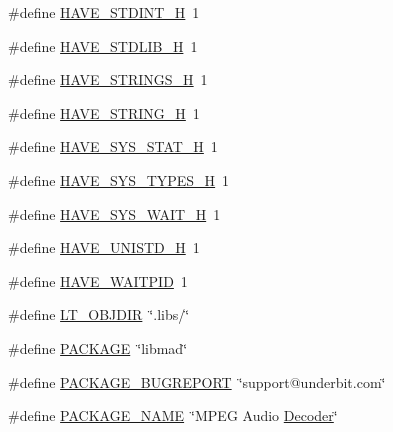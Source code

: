 \begin{DoxyCompactItemize}
\item 
\#define \hyperlink{mac_2config_2i386_2lib-src_2libmad_2config_8h_ab6cd6d1c63c1e26ea2d4537b77148354}{H\+A\+V\+E\+\_\+\+S\+T\+D\+I\+N\+T\+\_\+H}~1
\item 
\#define \hyperlink{mac_2config_2i386_2lib-src_2libmad_2config_8h_a9e0e434ec1a6ddbd97db12b5a32905e0}{H\+A\+V\+E\+\_\+\+S\+T\+D\+L\+I\+B\+\_\+H}~1
\item 
\#define \hyperlink{mac_2config_2i386_2lib-src_2libmad_2config_8h_a405d10d46190bcb0320524c54eafc850}{H\+A\+V\+E\+\_\+\+S\+T\+R\+I\+N\+G\+S\+\_\+H}~1
\item 
\#define \hyperlink{mac_2config_2i386_2lib-src_2libmad_2config_8h_ad4c234dd1625255dc626a15886306e7d}{H\+A\+V\+E\+\_\+\+S\+T\+R\+I\+N\+G\+\_\+H}~1
\item 
\#define \hyperlink{mac_2config_2i386_2lib-src_2libmad_2config_8h_ace156430ba007d19b4348a950d0c692b}{H\+A\+V\+E\+\_\+\+S\+Y\+S\+\_\+\+S\+T\+A\+T\+\_\+H}~1
\item 
\#define \hyperlink{mac_2config_2i386_2lib-src_2libmad_2config_8h_a69dc70bea5d1f8bd2be9740e974fa666}{H\+A\+V\+E\+\_\+\+S\+Y\+S\+\_\+\+T\+Y\+P\+E\+S\+\_\+H}~1
\item 
\#define \hyperlink{mac_2config_2i386_2lib-src_2libmad_2config_8h_af249315f5939884ce5b4585ca81a1e39}{H\+A\+V\+E\+\_\+\+S\+Y\+S\+\_\+\+W\+A\+I\+T\+\_\+H}~1
\item 
\#define \hyperlink{mac_2config_2i386_2lib-src_2libmad_2config_8h_a219b06937831d0da94d801ab13987639}{H\+A\+V\+E\+\_\+\+U\+N\+I\+S\+T\+D\+\_\+H}~1
\item 
\#define \hyperlink{mac_2config_2i386_2lib-src_2libmad_2config_8h_a9196ec9c05152e1058c8a20a5ffd3f1a}{H\+A\+V\+E\+\_\+\+W\+A\+I\+T\+P\+ID}~1
\item 
\#define \hyperlink{mac_2config_2i386_2lib-src_2libmad_2config_8h_ac2d5925d76379847dd9fc4747b061659}{L\+T\+\_\+\+O\+B\+J\+D\+IR}~\char`\"{}.libs/\char`\"{}
\item 
\#define \hyperlink{mac_2config_2i386_2lib-src_2libmad_2config_8h_aca8570fb706c81df371b7f9bc454ae03}{P\+A\+C\+K\+A\+GE}~\char`\"{}libmad\char`\"{}
\item 
\#define \hyperlink{mac_2config_2i386_2lib-src_2libmad_2config_8h_a1d1d2d7f8d2f95b376954d649ab03233}{P\+A\+C\+K\+A\+G\+E\+\_\+\+B\+U\+G\+R\+E\+P\+O\+RT}~\char`\"{}support@underbit.\+com\char`\"{}
\item 
\#define \hyperlink{mac_2config_2i386_2lib-src_2libmad_2config_8h_a1c0439e4355794c09b64274849eb0279}{P\+A\+C\+K\+A\+G\+E\+\_\+\+N\+A\+ME}~\char`\"{}M\+P\+EG Audio \hyperlink{class_decoder}{Decoder}\char`\"{}

\end{DoxyCompactItemize}
